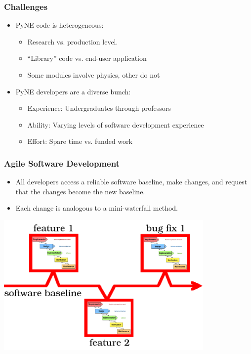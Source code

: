 \documentclass[12pt]{beamer}
\begin{document}
\begin{frame}[fragile]
\frametitle{Challenges}

\begin{itemize}
\item{PyNE code is heterogeneous:}
    \begin{itemize}
    \item{Research vs. production level.}
    \item{``Library'' code vs. end-user application}
    \item{Some modules involve physics, other  do not}
    \end{itemize}
\item{PyNE developers are a diverse bunch}:
   \begin{itemize}
   \item{Experience: Undergraduates through professors}
   \item{Ability: Varying levels of software development experience}
   \item{Effort: Spare time vs. funded work}
   \end{itemize}
\end{itemize}

\end{frame}
\begin{frame}
\frametitle{Agile Software Development\cite{larman2004agile}}

\begin{itemize}
\item{All developers access a reliable software baseline, make changes, and request that the changes become the new baseline.}
\item{Each change is analogous to a mini-waterfall method.}
\end{itemize}

\centerline{\includegraphics[width=0.8\textwidth]{figures/agile.png}}

\end{frame}
\end{document}
